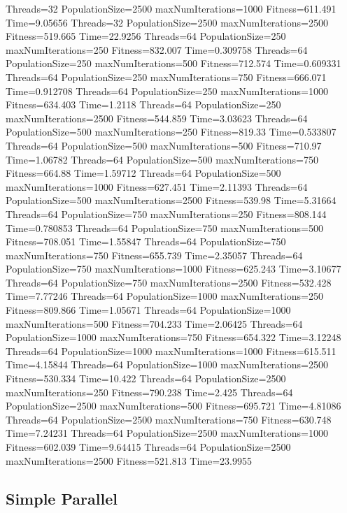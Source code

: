 \documentclass[10pt,letterpaper]{article}
\begin{document}
Threads=32 PopulationSize=2500 maxNumIterations=1000 Fitness=611.491 Time=9.05656
Threads=32 PopulationSize=2500 maxNumIterations=2500 Fitness=519.665 Time=22.9256
Threads=64 PopulationSize=250 maxNumIterations=250 Fitness=832.007 Time=0.309758
Threads=64 PopulationSize=250 maxNumIterations=500 Fitness=712.574 Time=0.609331
Threads=64 PopulationSize=250 maxNumIterations=750 Fitness=666.071 Time=0.912708
Threads=64 PopulationSize=250 maxNumIterations=1000 Fitness=634.403 Time=1.2118
Threads=64 PopulationSize=250 maxNumIterations=2500 Fitness=544.859 Time=3.03623
Threads=64 PopulationSize=500 maxNumIterations=250 Fitness=819.33 Time=0.533807
Threads=64 PopulationSize=500 maxNumIterations=500 Fitness=710.97 Time=1.06782
Threads=64 PopulationSize=500 maxNumIterations=750 Fitness=664.88 Time=1.59712
Threads=64 PopulationSize=500 maxNumIterations=1000 Fitness=627.451 Time=2.11393
Threads=64 PopulationSize=500 maxNumIterations=2500 Fitness=539.98 Time=5.31664
Threads=64 PopulationSize=750 maxNumIterations=250 Fitness=808.144 Time=0.780853
Threads=64 PopulationSize=750 maxNumIterations=500 Fitness=708.051 Time=1.55847
Threads=64 PopulationSize=750 maxNumIterations=750 Fitness=655.739 Time=2.35057
Threads=64 PopulationSize=750 maxNumIterations=1000 Fitness=625.243 Time=3.10677
Threads=64 PopulationSize=750 maxNumIterations=2500 Fitness=532.428 Time=7.77246
Threads=64 PopulationSize=1000 maxNumIterations=250 Fitness=809.866 Time=1.05671
Threads=64 PopulationSize=1000 maxNumIterations=500 Fitness=704.233 Time=2.06425
Threads=64 PopulationSize=1000 maxNumIterations=750 Fitness=654.322 Time=3.12248
Threads=64 PopulationSize=1000 maxNumIterations=1000 Fitness=615.511 Time=4.15844
Threads=64 PopulationSize=1000 maxNumIterations=2500 Fitness=530.334 Time=10.422
Threads=64 PopulationSize=2500 maxNumIterations=250 Fitness=790.238 Time=2.425
Threads=64 PopulationSize=2500 maxNumIterations=500 Fitness=695.721 Time=4.81086
Threads=64 PopulationSize=2500 maxNumIterations=750 Fitness=630.748 Time=7.24231
Threads=64 PopulationSize=2500 maxNumIterations=1000 Fitness=602.039 Time=9.64415
Threads=64 PopulationSize=2500 maxNumIterations=2500 Fitness=521.813 Time=23.9955


\subsection{Simple Parallel}
\end{document}
